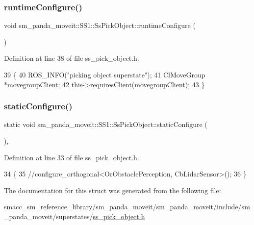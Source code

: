 \subsubsection{\texorpdfstring{runtime\+Configure()}{runtimeConfigure()}}
{\footnotesize\ttfamily void sm\+\_\+panda\+\_\+moveit\+::\+S\+S1\+::\+Ss\+Pick\+Object\+::runtime\+Configure (\begin{DoxyParamCaption}{ }\end{DoxyParamCaption})\hspace{0.3cm}{\ttfamily [inline]}}



Definition at line 38 of file ss\+\_\+pick\+\_\+object.\+h.


\begin{DoxyCode}
39     \{
40         ROS\_INFO(\textcolor{stringliteral}{"picking object superstate"});
41         ClMoveGroup *movegroupClient;
42         this->\hyperlink{classsmacc_1_1ISmaccState_a7f95c9f0a6ea2d6f18d1aec0519de4ac}{requiresClient}(movegroupClient);
43     \}
\end{DoxyCode}
\mbox{\label{structsm__panda__moveit_1_1SS1_1_1SsPickObject_a5fea44f39f59c7ef9db5769415bd8afc}} 
\subsubsection{\texorpdfstring{static\+Configure()}{staticConfigure()}}
{\footnotesize\ttfamily static void sm\+\_\+panda\+\_\+moveit\+::\+S\+S1\+::\+Ss\+Pick\+Object\+::static\+Configure (\begin{DoxyParamCaption}{ }\end{DoxyParamCaption})\hspace{0.3cm}{\ttfamily [inline]}, {\ttfamily [static]}}



Definition at line 33 of file ss\+\_\+pick\+\_\+object.\+h.


\begin{DoxyCode}
34     \{
35         \textcolor{comment}{//configure\_orthogonal<OrObstaclePerception, CbLidarSensor>();}
36     \}
\end{DoxyCode}


The documentation for this struct was generated from the following file\+:\begin{DoxyCompactItemize}
\item 
smacc\+\_\+sm\+\_\+reference\+\_\+library/sm\+\_\+panda\+\_\+moveit/sm\+\_\+panda\+\_\+moveit/include/sm\+\_\+panda\+\_\+moveit/superstates/\hyperlink{sm__panda__moveit_2sm__panda__moveit_2include_2sm__panda__moveit_2superstates_2ss__pick__object_8h}{ss\+\_\+pick\+\_\+object.\+h}\end{DoxyCompactItemize}
